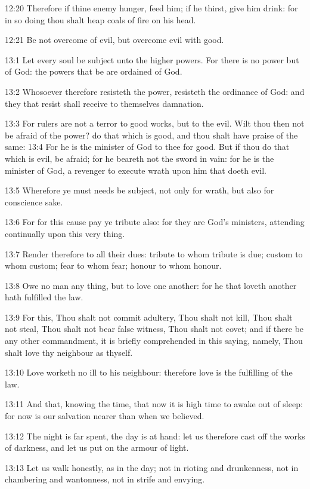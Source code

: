 12:20 Therefore if thine enemy hunger, feed him; if he thirst, give him drink: for in so doing thou shalt heap coals of fire on his head.

12:21 Be not overcome of evil, but overcome evil with good.

13:1 Let every soul be subject unto the higher powers. For there is no power but of God: the powers that be are ordained of God.

13:2 Whosoever therefore resisteth the power, resisteth the ordinance of God: and they that resist shall receive to themselves damnation.

13:3 For rulers are not a terror to good works, but to the evil. Wilt thou then not be afraid of the power? do that which is good, and thou shalt have praise of the same: 13:4 For he is the minister of God to thee for good. But if thou do that which is evil, be afraid; for he beareth not the sword in vain: for he is the minister of God, a revenger to execute wrath upon him that doeth evil.

13:5 Wherefore ye must needs be subject, not only for wrath, but also for conscience sake.

13:6 For for this cause pay ye tribute also: for they are God's ministers, attending continually upon this very thing.

13:7 Render therefore to all their dues: tribute to whom tribute is due; custom to whom custom; fear to whom fear; honour to whom honour.

13:8 Owe no man any thing, but to love one another: for he that loveth another hath fulfilled the law.

13:9 For this, Thou shalt not commit adultery, Thou shalt not kill, Thou shalt not steal, Thou shalt not bear false witness, Thou shalt not covet; and if there be any other commandment, it is briefly comprehended in this saying, namely, Thou shalt love thy neighbour as thyself.

13:10 Love worketh no ill to his neighbour: therefore love is the fulfilling of the law.

13:11 And that, knowing the time, that now it is high time to awake out of sleep: for now is our salvation nearer than when we believed.

13:12 The night is far spent, the day is at hand: let us therefore cast off the works of darkness, and let us put on the armour of light.

13:13 Let us walk honestly, as in the day; not in rioting and drunkenness, not in chambering and wantonness, not in strife and envying.

